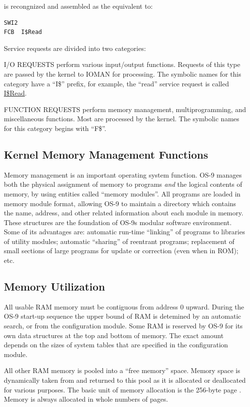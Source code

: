 \documentclass[
]{article}
\begin{document}
is recongnized and assembled as the equivalent to:

\begin{verbatim}
SWI2
FCB  I$Read
\end{verbatim}

Service requests are divided into two categories:

I/O REQUESTS perform various input/output functions. Requests of this
type are passed by the kernel to IOMAN for processing. The symbolic
names for this category have a ``I\$'' prefix, for example, the ``read''
service request is called \hyperref[i.read]{I\$Read}.

FUNCTION REQUESTS perform memory management, multiprogramming, and
miscellaneous functions. Most are processed by the kernel. The symbolic
names for this category begins with ``F\$''.

\subsection{Kernel Memory Management Functions}

Memory management is an important operating system function. OS-9
manages both the physical assignment of memory to programs \emph{and}
the logical contents of memory, by using entities called ``memory
modules''. All programs are loaded in memory module format, allowing
OS-9 to maintain a directory which contains the name, address, and other
related information about each module in memory. These structures are
the foundation of OS-9\textquotesingle s modular software environment.
Some of its advantages are: automatic run-time ``linking'' of programs
to libraries of utility modules; automatic ``sharing'' of reentrant
programs; replacement of small sections of large programs for update or
correction (even when in ROM); etc.

\subsection{Memory Utilization}

All usable RAM memory must be contiguous from address 0 upward. During
the OS-9 start-up sequence the upper bound of RAM is detemined by an
automatic search, or from the configuration module. Some RAM is reserved
by OS-9 for its own data structures at the top and bottom of memory. The
exact amount depends on the sizes of system tables that are specified in
the configuration module.

All other RAM memory is pooled into a ``free memory'' space. Memory
space is dynamically taken from and returned to this pool as it is
allocated or deallocated for various purposes. The basic unit of memory
allocation is the 256-byte page . Memory is always allocated in whole
numbers of pages.
\end{document}
